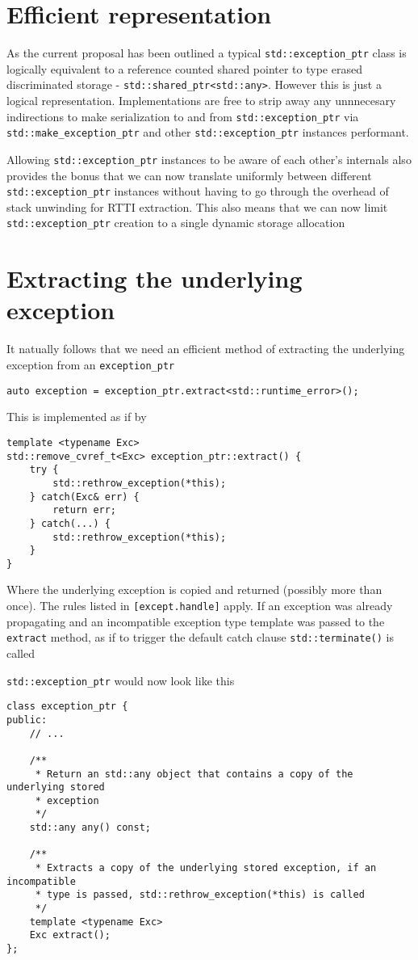 \documentclass{article}
\begin{document}
\section{Efficient representation}
As the current proposal has been outlined a typical \texttt{std::exception\_ptr}
class is logically equivalent to a reference counted shared pointer to type
erased discriminated storage - \texttt{std::shared\_ptr<std::any>}.  However
this is just a logical representation.  Implementations are free to strip away
any unnnecesary indirections to make serialization to and from
\texttt{std::exception\_ptr} via \texttt{std::make\_exception\_ptr} and other
\texttt{std::exception\_ptr} instances performant.

Allowing \texttt{std::exception\_ptr} instances to be aware of each other's
internals also provides the bonus that we can now translate uniformly between
different \texttt{std::exception\_ptr} instances without having to go through
the overhead of stack unwinding for RTTI extraction.  This also means that we
can now limit \texttt{std::exception\_ptr} creation to a single dynamic
storage allocation

\section{Extracting the underlying exception}
It natually follows that we need an efficient method of extracting the
underlying exception from an \texttt{exception\_ptr}
\begin{lstlisting}
auto exception = exception_ptr.extract<std::runtime_error>();
\end{lstlisting}

This is implemented as if by
\begin{lstlisting}
template <typename Exc>
std::remove_cvref_t<Exc> exception_ptr::extract() {
    try {
        std::rethrow_exception(*this);
    } catch(Exc& err) {
        return err;
    } catch(...) {
        std::rethrow_exception(*this);
    }
}
\end{lstlisting}

Where the underlying exception is copied and returned (possibly more than
once).  The rules listed in \texttt{[except.handle]} apply.  If an exception
was already propagating and an incompatible exception type template was passed
to the \texttt{extract} method, as if to trigger the default catch clause
\texttt{std::terminate()} is called

\texttt{std::exception\_ptr} would now look like this
\begin{lstlisting}
class exception_ptr {
public:
    // ...

    /**
     * Return an std::any object that contains a copy of the underlying stored
     * exception
     */
    std::any any() const;

    /**
     * Extracts a copy of the underlying stored exception, if an incompatible
     * type is passed, std::rethrow_exception(*this) is called
     */
    template <typename Exc>
    Exc extract();
};
\end{lstlisting}
\end{document}
